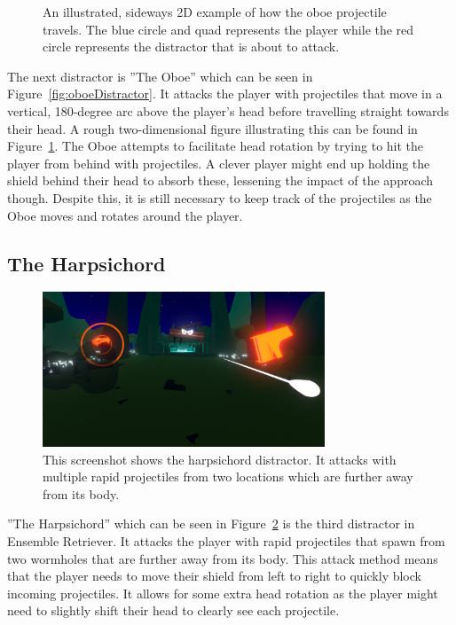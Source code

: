 \begin{figure}[htbp]
  \centering
  
  \caption[Sideways 2D Example of Oboe Projectile Path]{An illustrated, sideways 2D example of how the oboe projectile travels. The blue circle and quad represents the player while the red circle represents the distractor that is about to attack.}
  \label{fig:oboeProjectile}
\end{figure}
The next distractor is ''The Oboe'' which can be seen in Figure~\ref{fig:oboeDistractor}. It attacks the player with projectiles that move in a vertical, 180-degree arc above the player's head before travelling straight towards their head. A rough two-dimensional figure illustrating this can be found in Figure~\ref{fig:oboeProjectile}. The Oboe attempts to facilitate head rotation by trying to hit the player from behind with projectiles. A clever player might end up holding the shield behind their head to absorb these, lessening the impact of the approach though. Despite this, it is still necessary to keep track of the projectiles as the Oboe moves and rotates around the player. 

\subsection{The Harpsichord}
\begin{figure}[tbph]
    \centering
    \includegraphics[width=0.75\textwidth]{figures/screenshots/harpsichord.png}
    \caption[The Harpsichord Distractor]{This screenshot shows the harpsichord distractor. It attacks with multiple rapid projectiles from two locations which are further away from its body.}
    \label{fig:harpsichordDistractor}
\end{figure}
''The Harpsichord'' which can be seen in Figure~\ref{fig:harpsichordDistractor} is the third distractor in Ensemble Retriever. It attacks the player with rapid projectiles that spawn from two wormholes that are further away from its body. This attack method means that the player needs to move their shield from left to right to quickly block incoming projectiles. It allows for some extra head rotation as the player might need to slightly shift their head to clearly see each projectile. 


